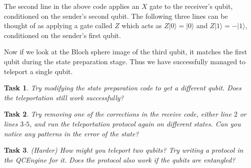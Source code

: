 \documentclass[twocolumn]{article}
\newtheorem{task}{Task}[section]
\begin{document}
The second line in the above code applies an $X$ gate to the receiver's qubit, conditioned on the sender's second qubit. The following three lines can be thought of as applying a gate called $Z$ which acts as $Z|0\rangle = |0\rangle$ and $Z|1\rangle = -|1\rangle$, conditioned on the sender's first qubit.

Now if we look at the Bloch sphere image of the third qubit, it matches the first qubit during the state preparation stage. Thus we have successfully managed to teleport a single qubit.

\begin{task}
Try modifying the state preparation code to get a different qubit. Does the teleportation still work successfully?
\end{task}

\begin{task}
Try removing one of the corrections in the receive code, either line $2$ or lines $3$-$5$, and run the teleportation protocol again on different states. Can you notice any patterns in the error of the state?
\end{task}

\begin{task}
(Harder) How might you teleport two qubits? Try writing a protocol in the QCEngine for it. Does the protocol also work if the qubits are entangled?
\end{task}
\end{document}
